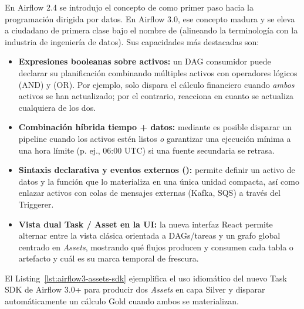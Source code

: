 En Airflow 2.4 se introdujo el concepto de  como primer paso hacia la programación dirigida por datos. En Airflow 3.0, ese concepto madura y se eleva a ciudadano de primera clase bajo el nombre de \textbf{} (alineando la terminología con la industria de ingeniería de datos). Sus capacidades más destacadas son:
\begin{itemize}
  \item \textbf{Expresiones booleanas sobre activos:} un DAG consumidor puede declarar su planificación combinando múltiples activos con operadores lógicos \code{\&} (AND) y \code{|} (OR). Por ejemplo,  solo dispara el cálculo financiero cuando \textit{ambos} activos se han actualizado; por el contrario,  reacciona en cuanto se actualiza cualquiera de los dos.
  \item \textbf{Combinación híbrida tiempo + datos:} mediante  es posible disparar un pipeline cuando los activos estén listos \textit{o} garantizar una ejecución mínima a una hora límite (p. ej., 06:00 UTC) si una fuente secundaria se retrasa.
  \item \textbf{Sintaxis declarativa  y eventos externos ():} permite definir un activo de datos y la función que lo materializa en una única unidad compacta, así como enlazar activos con colas de mensajes externas (Kafka, SQS) a través del Triggerer.
  \item \textbf{Vista dual Task / Asset en la UI:} la nueva interfaz React permite alternar entre la vista clásica orientada a DAGs/tareas y un grafo global centrado en \textit{Assets}, mostrando qué flujos producen y consumen cada tabla o artefacto y cuál es su marca temporal de frescura.
\end{itemize}

El Listing~\ref{lst:airflow3-assets-sdk} ejemplifica el uso idiomático del nuevo Task SDK de Airflow 3.0+ para producir dos \textit{Assets} en capa Silver y disparar automáticamente un cálculo Gold cuando ambos se materializan.

